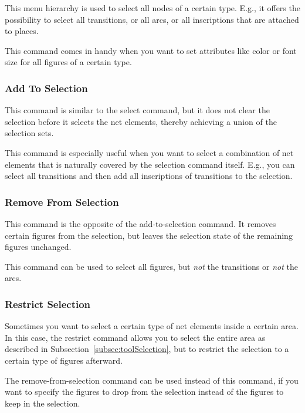 This menu hierarchy is used to select all nodes of a certain type.
E.g., it offers the possibility to select all transitions,
or all arcs, or all inscriptions that are attached to places.

This command comes in handy when you want to set attributes like
color or font size for all figures of a certain type.

\subsubsection{Add To Selection}

This command is similar to the select command, but it does not clear
the selection before it selects the net elements, thereby achieving
a union of the selection sets.

This command is especially useful when you want to select
a combination of net elements that is naturally covered
by the selection command itself. E.g., you can select all transitions
and then add all inscriptions of transitions to the selection.

\subsubsection{Remove From Selection}

This command is the opposite of the add-to-selection command.
It removes certain figures from the selection, but leaves
the selection state of the remaining figures unchanged.

This command can be used to select all figures, but \emph{not}
the transitions or \emph{not} the arcs.

\subsubsection{Restrict Selection}

Sometimes you want to select a certain type of net elements
inside a certain area. In this case, the restrict command
allows you to select the entire area as described in
Subsection~\ref{subsec:toolSelection}, but to restrict the selection
to a certain type of figures afterward.

The remove-from-selection command can be used instead of
this command, if you want to specify the figures to drop from
the selection instead of the figures to keep in the selection.

%

